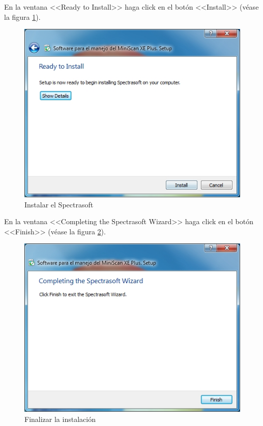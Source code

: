 En la ventana <<Ready to Install>> haga click en el bot\'{o}n <<Install>> (v\'{e}ase la figura \ref{fig:spectrasoft-instalar}).
\vfill
\begin{figure}[H]
  \centering
  \includegraphics[width=.6\linewidth]{./img/spectrasoft-instalar.jpg}
\caption[]{Instalar el Spectrasoft\label{fig:spectrasoft-instalar}}
\end{figure}
\vfill
En la ventana <<Completing the Spectrasoft Wizard>> haga click en el bot\'{o}n <<Finish>> (v\'{e}ase la figura \ref{fig:spectrasoft-finalizar}).
\vfill
\begin{figure}[H]
  \centering
  \includegraphics[width=.6\linewidth]{./img/spectrasoft-finalizar.jpg}
\caption[]{Finalizar la instalaci\'{o}n\label{fig:spectrasoft-finalizar}}
\end{figure}
\vfill
\newpage

